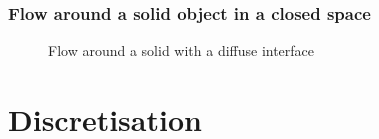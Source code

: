 \documentclass[a4paper]{report}
\begin{document}
\subsection*{Flow around a solid object in a closed space}

\begin{figure}[!htbp]
\centering
{}
\hspace{.25in}
\hspace{.25in}
\centering
\caption{Flow around a solid with a diffuse interface}
\end{figure}

\chapter{Discretisation}
\end{document}
